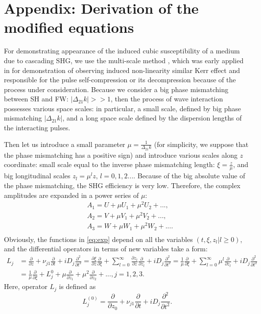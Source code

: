 \documentclass[a4paper, 12pt, onecolumn]{extarticle}
\begin{document}
\section*{Appendix: Derivation of the modified equations}
For demonstrating  appearance of the  induced cubic susceptibility of a medium due to cascading SHG, we use the multi-scale method \cite{bib:n24}, which was early applied in \cite{bib:n19} for demonstration of observing induced non-linearity similar Kerr effect and responsible for the pulse self-compression or its decompression  because of the  process under consideration. Because we consider a big phase mismatching between SH and FW: \(|\Delta_{21}k|>>1\), then the process of wave interaction possesses various space scales: in particular, a small scale, defined by big phase mismatching \(|\Delta_{21}k|\), and a long space scale defined by the dispersion lengths of the interacting pulses. 

Then let us introduce a small parameter \(\mu=\frac{1}{\Delta_{21}k}\) (for simplicity, we suppose that the phase mismatching has a positive sign) and introduce various scales along \(z\) coordinate: small scale equal to the inverse phase mismatching length: \(\xi=\frac{z}{\mu}\), and big longitudinal scales \(z_l=\mu^lz,\,l=0,1,2...\). Because of the big absolute value of the phase mismatching, the SHG efficiency is very low. Therefore, the complex amplitudes are expanded in a power series of \(\mu\):
\begin{equation}
\label{eq:exp}
\begin{aligned}
&A_1=U+\mu U_1 +\mu^2 U_2 +...,\\
&A_2=V+\mu V_1 + \mu^2 V_2 +...,\\
&A_3=W+\mu W_1 + \mu^2 W_2+....\\
\end{aligned}
\end{equation}
Obviously, the functions in \eqref{eq:exp} depend on all the variables \((t,\xi,z_l|l\ge0)\), and
the differential operators in terms of new variables take a form:
\begin{equation}
\label{eq:op}
\begin{aligned}
L_j&=\frac{\partial}{\partial z}+\nu_{j1}\frac{\partial}{\partial t}+iD_j\frac{\partial^2}{\partial t^2}=\frac{\partial \xi}{\partial z}\frac{\partial}{\partial \xi}+\sum\limits_{l=0}^{\infty}\frac{\partial z_l}{\partial z}\frac{\partial}{\partial z_l}+iD_j\frac{\partial^2}{\partial t^2}=\frac{1}{\mu}\frac{\partial}{\partial \xi}+\sum\limits_{l=0}^{\infty} \mu^l\frac{\partial}{\partial z_l}+iD_j\frac{\partial^2}{\partial t^2}\\
&=\frac{1}{\mu}\frac{\partial}{\partial \xi}+L_j^{0}+\mu\frac{\partial}{\partial z_1}+\mu^2 \frac{\partial}{\partial z_2}+...,j=1,2,3.
\end{aligned}
\end{equation}
Here, operator \(L_j\) is defined as 
\[L_j^{(0)}=\frac{\partial}{\partial z_0}+\nu_{j1}\frac{\partial}{\partial t}+ iD_j\frac{\partial^2}{\partial t^2}.\]
\end{document}
